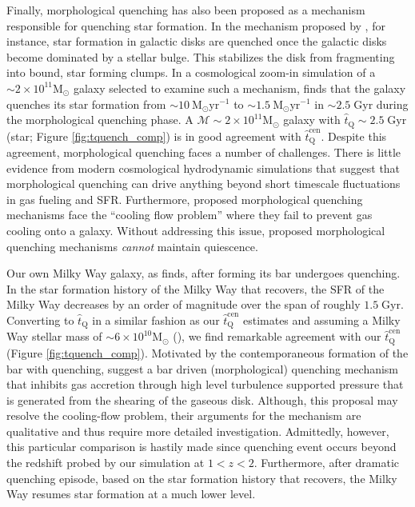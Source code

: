 \documentclass[iop,apj,tighten,twocolappendix,numberedappendix]{emulateapj}
\begin{document}
Finally, morphological quenching has also been proposed as a mechanism responsible 
for quenching star formation. In the mechanism proposed by \cite{Martig:2009aa}, 
for instance, star formation in galactic disks are 
quenched once the galactic disks become dominated by
a stellar bulge. This stabilizes the disk from fragmenting 
into bound, star forming clumps. In a cosmological zoom-in simulation of a 
$\sim 2 \times 10^{11} \mathrm{M}_\odot$ galaxy selected to examine such 
a mechanism, \cite{Martig:2009aa} finds that the galaxy quenches its star formation
from $\sim 10~\mathrm{M}_\odot\mathrm{yr}^{-1}$ to 
$\sim 1.5~\mathrm{M}_\odot\mathrm{yr}^{-1}$
in $\sim 2.5\;\mathrm{Gyr}$ during the morphological quenching phase. A 
$\mathcal{M} \sim 2 \times 10^{11} \mathrm{M}_\odot$ galaxy with 
$\hat{t}_\mathrm{Q} \sim 2.5\;\mathrm{Gyr}$ (star; Figure \ref{fig:tquench_comp}) 
is in good agreement with $\hat{t}_\mathrm{Q}^\mathrm{cen}$. 
Despite this agreement, morphological quenching faces a number 
of challenges. There is little evidence from modern cosmological
hydrodynamic simulations that suggest that morphological quenching can
drive anything beyond short timescale fluctuations in gas fueling and 
SFR. Furthermore, proposed morphological quenching mechanisms
face the ``cooling flow problem'' where they fail to prevent 
gas cooling onto a galaxy. Without addressing this issue, proposed 
morphological quenching mechanisms {\em cannot} maintain quiescence.

Our own Milky Way galaxy, as \cite{Haywood:2016aa} finds, after forming its
bar undergoes quenching. In the star formation history of the Milky Way 
that \cite{Haywood:2016aa} recovers, the SFR of the Milky Way decreases 
by an order of magnitude over the span of roughly 
$1.5\;\mathrm{Gyr}$. Converting to $\hat{t}_\mathrm{Q}$ in a similar fashion
as our $\hat{t}_\mathrm{Q}^\mathrm{cen}$ estimates and assuming a Milky Way stellar
mass of $\sim 6\times 10^{10}\mathrm{M}_\odot$ 
(\citealt{Licquia:2015aa, Haywood:2016aa}), 
we find remarkable agreement with our $\hat{t}_\mathrm{Q}^\mathrm{cen}$ 
(Figure \ref{fig:tquench_comp}). 
Motivated by the contemporaneous formation of the bar with quenching, 
\cite{Haywood:2016aa} suggest a bar driven (morphological) quenching mechanism 
that inhibits gas accretion through high level turbulence supported pressure 
that is generated from the shearing of the gaseous disk. Although, 
this proposal may resolve the cooling-flow problem, their arguments for the
mechanism are qualitative and thus require more detailed investigation. 
Admittedly, however, this particular comparison is hastily made since quenching 
event occurs beyond the redshift probed by our simulation at 
$1 < z < 2$. Furthermore, after dramatic quenching episode, based on 
the star formation history that \cite{Haywood:2016aa} recovers, the Milky Way
resumes star formation at a much lower level. 
\end{document}
